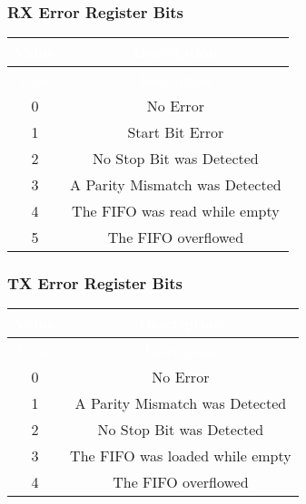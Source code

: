 \subsubsection{RX Error Register Bits}
\renewcommand*{\arraystretch}{1.25}
\begingroup
\small
{}
\begin{longtable}{|c|c|}
    \hline
    \rowcolor{gray}
    \textcolor{white}{Value} & \textcolor{white}{Description}  \\ \hline
    \endfirsthead

    \hline
    \rowcolor{gray}
    \textcolor{white}{Value} & \textcolor{white}{Description}  \\ \hline
    \endhead

    \hline
    \endfoot

    0 & No Error \\ \hline
    1 & Start Bit Error \\ \hline
    2 & No Stop Bit was Detected \\ \hline
    3 & A Parity Mismatch was Detected \\ \hline
    4 & The FIFO was read while empty \\ \hline
    5 & The FIFO overflowed \\ \hline
\end{longtable}
\label{table:uart_rx_error}
\endgroup

\subsubsection{TX Error Register Bits}
\renewcommand*{\arraystretch}{1.25}
\begingroup
\small
{}
\begin{longtable}{|c|c|}
    \hline
    \rowcolor{gray}
    \textcolor{white}{Value} & \textcolor{white}{Description}  \\ \hline
    \endfirsthead

    \hline
    \rowcolor{gray}
    \textcolor{white}{Value} & \textcolor{white}{Description}  \\ \hline
    \endhead

    \hline
    \endfoot

    0 & No Error \\ \hline
    1 & A Parity Mismatch was Detected \\ \hline
    2 & No Stop Bit was Detected \\ \hline
    3 & The FIFO was loaded while empty \\ \hline
    4 & The FIFO overflowed \\ \hline
\end{longtable}
\label{table:uart_tx_error}
\endgroup

